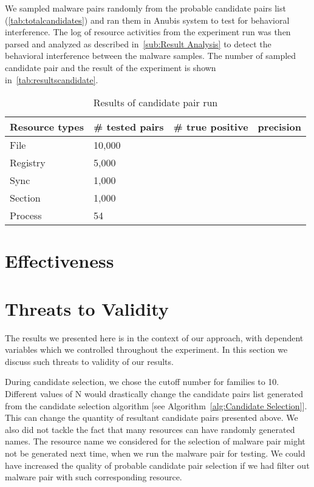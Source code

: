 We sampled malware pairs randomly from the probable candidate pairs list (\autoref{tab:totalcandidates}) and ran them in Anubis system to test for behavioral interference.
The log of resource activities from the experiment run was then parsed and analyzed as described in~\autoref{sub:Result Analysis} to detect the behavioral interference between the malware samples.
The number of sampled candidate pair and the result of the experiment is shown in~\autoref{tab:resultscandidate}.
\begin{table}[ht]
  \caption[Results of candidate pair run]{Results of candidate pair run}\label{tab:resultscandidate}
  \centering
  \begin{tabular}{l l l l}
    \toprule
    Resource types & \# tested pairs & \# true positive & precision\\
    \midrule
    File & 10,000\\
    Registry & 5,000\\
    Sync & 1,000\\
    Section & 1,000\\
    Process & 54\\
    \bottomrule
  \end{tabular}
\end{table}
\section{Effectiveness}
\label{sec:Effectiveness}

\section{Threats to Validity}
\label{sec:Threats to Validity}
The results we presented here is in the context of our approach, with dependent variables which we controlled throughout the experiment.
In this section we discuss such threats to validity of our results.

During candidate selection, we chose the cutoff number for families to 10.
Different values of N would drastically change the candidate pairs list generated from the candidate selection algorithm [see Algorithm~\autoref{alg:Candidate Selection}].
This can change the quantity of resultant candidate pairs presented above.
We also did not tackle the fact that many resources can have randomly generated names.
The resource name we considered for the selection of malware pair might not be generated next time, when we run the malware pair for testing.
We could have increased the quality of probable candidate pair selection if we had filter out malware pair with such corresponding resource.

